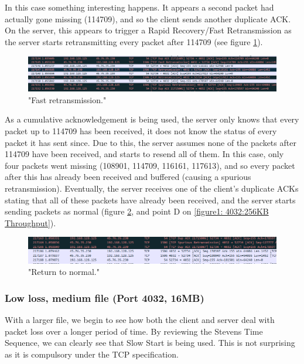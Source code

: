 \documentclass[12pt]{article}
\begin{document}
In this case something interesting happens.
It appears a second packet had actually gone missing (114709), and so the client sends another duplicate ACK.
On the server, this appears to trigger a Rapid Recovery/Fast Retransmission as the server starts retransmitting every packet after 114709 (see figure \ref{figure4: Fast retransmission}).

\begin{figure}[!htbp]
  \centering
  \includegraphics[width=\linewidth]{4032-256KB-fast-retransmission.PNG}
  \caption{"Fast retransmission."}
  \label{figure4: Fast retransmission}
\end{figure}

As a cumulative acknowledgement is being used, the server only knows that every packet up to 114709 has been received, it does not know the status of every packet it has sent since.
Due to this, the server assumes none of the packets after 114709 have been received, and starts to resend all of them.
In this case, only four packets went missing (108901, 114709, 116161, 117613), and so every packet after this has already been received and buffered (causing a spurious retransmission).
Eventually, the server receives one of the client's duplicate ACKs stating that all of these packets have already been received, and the server starts sending packets as normal (figure \ref{figure5: Return to normal}, and point D on \ref{figure1: 4032:256KB Throughput}).

\begin{figure}[!htbp]
  \centering
  \includegraphics[width=\linewidth]{4032-256KB-back-to-normal.PNG}
  \caption{"Return to normal."}
  \label{figure5: Return to normal}
\end{figure}

\subsubsection*{Low loss, medium file (Port 4032, 16MB)}
With a larger file, we begin to see how both the client and server deal with packet loss over a longer period of time.
By reviewing the Stevens Time Sequence, we can clearly see that Slow Start is being used. 
This is not surprising as it is compulsory under the TCP specification.
\end{document}
